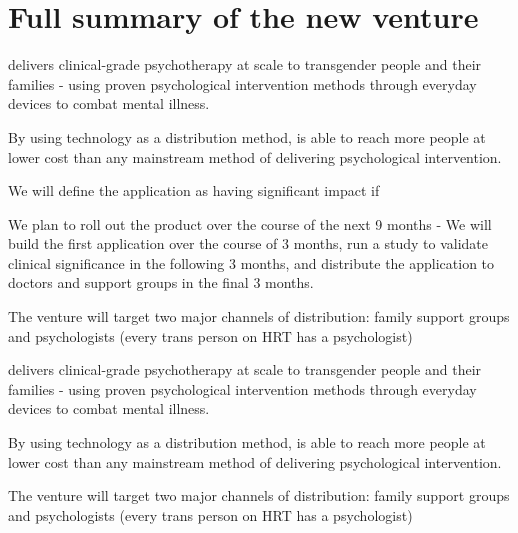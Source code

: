 \section{Full summary of the new venture}


\app delivers clinical-grade psychotherapy at scale to transgender people and their families - using proven psychological intervention methods through everyday devices to combat mental illness. 


By using technology as a distribution method, \app is able to reach more people at lower cost than any mainstream method of delivering psychological intervention.




We will define the application as having significant impact if 


We plan to roll out the product over the course of the next 9 months - We will build the first application over the course of 3 months, run a study to validate clinical significance in the following 3 months, and distribute the application to doctors and support groups in the final 3 months.


The venture will target two major channels of distribution: family support groups and psychologists (every trans person on HRT has a psychologist)





\app delivers clinical-grade psychotherapy at scale to transgender people and their families - using proven psychological intervention methods through everyday devices to combat mental illness. 

By using technology as a distribution method, \app is able to reach more people at lower cost than any mainstream method of delivering psychological intervention.

The venture will target two major channels of distribution: family support groups and psychologists (every trans person on HRT has a psychologist)

